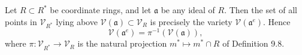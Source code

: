 Let $R \subset R^*$ be coordinate rings, and let $\mathfrak{a}$ be any ideal of $R$. Then the set of all points in $\mathcal{V}_{R^*}$ lying above $\mathcal{V}(\mathfrak{a}) \subset \mathcal{V}_R$ is precisely the variety $\mathcal{V}(\mathfrak{a}^e)$. Hence
$$\mathcal{V}(\mathfrak{a}^e) = \pi^{-1}(\mathcal{V}(\mathfrak{a})),$$
where $\pi : \mathcal{V}_{R^*} \to \mathcal{V}_R$ is the natural projection $m^* \mapsto m^* \cap R$ of Definition 9.8.
